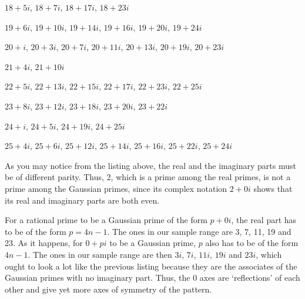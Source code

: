 \documentclass[12pt]{article}
\begin{document}
$18 + 5i$, $18 + 7i$, $18 + 17i$, $18 + 23i$

$19 + 6i$, $19 + 10i$, $19 + 14i$, $19 + 16i$, $19 + 20i$, $19 + 24i$

$20 + i$, $20 + 3i$, $20 + 7i$, $20 + 11i$, $20 + 13i$, $20 + 19i$, $20 + 23i$

$21 + 4i$, $21 + 10i$

$22 + 5i$, $22 + 13i$, $22 + 15i$, $22 + 17i$, $22 + 23i$, $22 + 25i$

$23 + 8i$, $23 + 12i$, $23 + 18i$, $23 + 20i$, $23 + 22i$

$24 + i$, $24 + 5i$, $24 + 19i$, $24 + 25i$

$25 + 4i$, $25 + 6i$, $25 + 12i$, $25 + 14i$, $25 + 16i$, $25 + 22i$, $25 + 24i$

As you may notice from the listing above, the real and the imaginary parts must be of different parity. Thus, 2, which is a prime among the real primes, is not a prime among the Gaussian primes, since its complex notation $2 + 0i$ shows that its real and imaginary parts are both even.

For a rational prime to be a Gaussian prime of the form $p + 0i$, the real part has to be of the form $p = 4n - 1$. The ones in our sample range are 3, 7, 11, 19 and 23. As it happens, for $0 + pi$ to be a Gaussian prime, $p$ also has to be of the form $4n - 1$. The ones in our sample range are then $3i$, $7i$, $11i$, $19i$ and $23i$, which ought to look a lot like the previous listing because they are the associates of the Gaussian primes with no imaginary part. Thus, the 0 axes are `reflections' of each other and give yet more axes of symmetry of the pattern.
\end{document}
